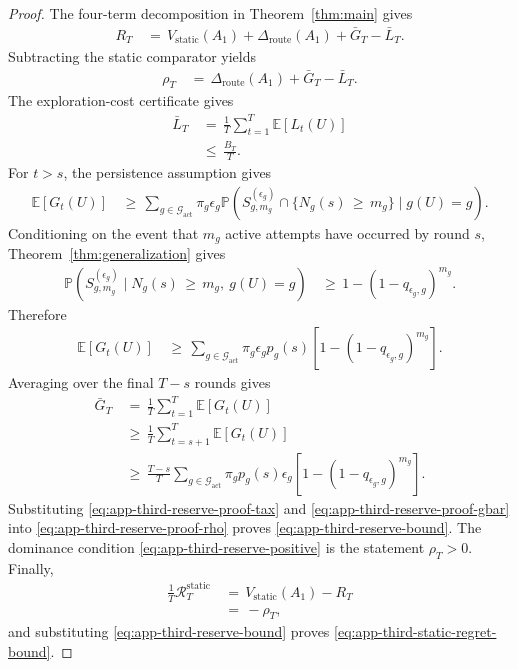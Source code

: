 \documentclass{article} %
\begin{document}
\begin{proof}
The four-term decomposition in Theorem~\ref{thm:main} gives
\begin{align}
\label{eq:app-third-reserve-proof-main}
R_T
&\,=\,
V_{\mathrm{static}}(A_1)
+
\Delta_{\mathrm{route}}(A_1)
+
\bar G_T
-
\bar L_T.
\end{align}
Subtracting the static comparator yields
\begin{align}
\label{eq:app-third-reserve-proof-rho}
\rho_T
&\,=\,
\Delta_{\mathrm{route}}(A_1)
+
\bar G_T
-
\bar L_T.
\end{align}
The exploration-cost certificate gives
\begin{align}
\label{eq:app-third-reserve-proof-tax}
\bar L_T
&\,=\,
\frac{1}{T}
\sum_{t=1}^{T}
\mathbb{E}[L_t(U)]
\\
&\,\le\,
\frac{B_T}{T}.
\end{align}
For \(t>s\), the persistence assumption gives
\begin{align}
\label{eq:app-third-reserve-proof-discovery-t}
\mathbb{E}[G_t(U)]
&\,\ge\,
\sum_{g\in\mathcal{G}_{\mathrm{act}}}
\pi_g
\epsilon_g
\mathbb{P}\!\left(
S_{g,m_g}^{(\epsilon_g)}
\cap
\{N_g(s)\,\ge\, m_g\}
\mid
g(U)=g
\right).
\end{align}
Conditioning on the event that \(m_g\) active attempts have occurred by round \(s\), Theorem~\ref{thm:generalization} gives
\begin{align}
\label{eq:app-third-reserve-proof-success-cond}
\mathbb{P}\!\left(
S_{g,m_g}^{(\epsilon_g)}
\mid
N_g(s)\,\ge\, m_g,\ g(U)=g
\right)
&\,\ge\,
1-(1-q_{\epsilon_g,g})^{m_g}.
\end{align}
Therefore
\begin{align}
\label{eq:app-third-reserve-proof-discovery-t-final}
\mathbb{E}[G_t(U)]
&\,\ge\,
\sum_{g\in\mathcal{G}_{\mathrm{act}}}
\pi_g
\epsilon_g
p_g(s)
\left[
1-(1-q_{\epsilon_g,g})^{m_g}
\right].
\end{align}
Averaging over the final \(T-s\) rounds gives
\begin{align}
\label{eq:app-third-reserve-proof-gbar}
\bar G_T
&\,=\,
\frac{1}{T}
\sum_{t=1}^{T}
\mathbb{E}[G_t(U)]
\\
&\,\ge\,
\frac{1}{T}
\sum_{t=s+1}^{T}
\mathbb{E}[G_t(U)]
\\
&\,\ge\,
\frac{T-s}{T}
\sum_{g\in\mathcal{G}_{\mathrm{act}}}
\pi_g
p_g(s)
\epsilon_g
\left[
1-(1-q_{\epsilon_g,g})^{m_g}
\right].
\end{align}
Substituting \eqref{eq:app-third-reserve-proof-tax} and \eqref{eq:app-third-reserve-proof-gbar} into \eqref{eq:app-third-reserve-proof-rho} proves \eqref{eq:app-third-reserve-bound}.  The dominance condition \eqref{eq:app-third-reserve-positive} is the statement \(\rho_T>0\).  Finally,
\begin{align}
\label{eq:app-third-reserve-proof-static-regret}
\frac{1}{T}
\mathcal{R}_{T}^{\mathrm{static}}
&\,=\,
V_{\mathrm{static}}(A_1)
-
R_T
\\
&\,=\,
-\rho_T,
\end{align}
and substituting \eqref{eq:app-third-reserve-bound} proves \eqref{eq:app-third-static-regret-bound}.
\end{proof}
\end{document}
